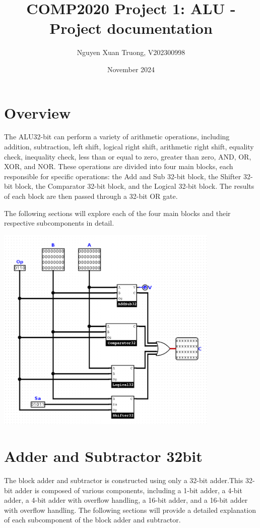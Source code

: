 \documentclass{article}
\title{COMP2020 Project 1: ALU - Project documentation}
\author{Nguyen Xuan Truong, V202300998}
\date{November 2024}
\begin{document}
\maketitle
\section{Overview}
\hspace*{2em}The ALU32-bit can perform a variety of arithmetic operations, including addition, subtraction, left shift, logical right shift, arithmetic right shift, equality check, inequality check, less than or equal to zero, greater than zero, AND, OR, XOR, and NOR. These operations are divided into four main blocks, each responsible for specific operations: the Add and Sub 32-bit block, the Shifter 32-bit block, the Comparator 32-bit block, and the Logical 32-bit block. The results of each block are then passed through a 32-bit OR gate. 

The following sections will explore each of the four main blocks and their respective subcomponents in detail.
\begin{center}
    \includegraphics[width=0.8\textwidth]{images/Overview.png}
\end{center}

\section{Adder and Subtractor 32bit}
\hspace*{2em}The block adder and subtractor is constructed using only a 32-bit adder.This 32-bit adder is composed of various components, including a 1-bit adder, a 4-bit adder, a 4-bit adder with overflow handling, a 16-bit adder, and a 16-bit adder with overflow handling. The following sections will provide a detailed explanation of each subcomponent of the block adder and subtractor.
\end{document}
